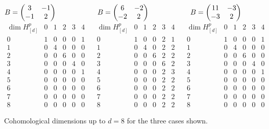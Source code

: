 \documentclass[10pt,a4paper]{amsart}
\numberwithin{equation}{section}
\begin{document}
\begin{figure}[t]\centering
$B=\begin{pmatrix}3 & -1 \\ -1 & 2\end{pmatrix}\hspace{20mm} B=\begin{pmatrix} 6 & -2 \\ -2 & 2 \end{pmatrix} \hspace{20mm} B=\begin{pmatrix}11 & -3 \\ -3 & 2 \end{pmatrix}$
\vspace{1mm}\\
$\begin{array}{c|ccccc}
\dim H_{[d]}^p & 0 & 1 & 2 & 3 & 4 \\ \hline
0 & 1 & 0 & 0 & 0 & 1 \\
1 & 0 & 4 & 0 & 0 & 0 \\
2 & 0 & 0 & 6 & 0 & 0 \\
3 & 0 & 0 & 0 & 4 & 0 \\
4 & 0 & 0 & 0 & 0 & 1 \\
5 & 0 & 0 & 0 & 0 & 0 \\
6 & 0 & 0 & 0 & 0 & 0 \\
7 & 0 & 0 & 0 & 0 & 0 \\
8 & 0 & 0 & 0 & 0 & 0
\end{array}\ \ \ \
\begin{array}{c|ccccc}
\dim H_{[d]}^p & 0 & 1 & 2 & 3 & 4 \\ \hline
0 & 1 & 0 & 0 & 2 & 1 \\
1 & 0 & 4 & 0 & 2 & 2 \\
2 & 0 & 0 & 6 & 2 & 2 \\
3 & 0 & 0 & 0 & 6 & 2 \\
4 & 0 & 0 & 0 & 2 & 3 \\
5 & 0 & 0 & 0 & 2 & 2 \\
6 & 0 & 0 & 0 & 2 & 2 \\
7 & 0 & 0 & 0 & 2 & 2 \\
8 & 0 & 0 & 0 & 2 & 2
\end{array}\ \ \ \
\begin{array}{c|ccccc}
\dim H_{[d]}^p & 0 & 1 & 2 & 3 & 4 \\ \hline
0 & 1 & 0 & 0 & 0 & 1 \\
1 & 0 & 4 & 0 & 0 & 0 \\
2 & 0 & 0 & 6 & 0 & 0 \\
3 & 0 & 0 & 0 & 4 & 0 \\
4 & 0 & 0 & 0 & 0 & 1 \\
5 & 0 & 0 & 0 & 0 & 0 \\
6 & 0 & 0 & 0 & 0 & 0 \\
7 & 0 & 0 & 0 & 0 & 0 \\
8 & 0 & 0 & 0 & 0 & 0
\end{array}$
\caption{Cohomological dimensions up to $d=8$ for the three cases shown.}\label{table2_results}
\end{figure}
\end{document}
